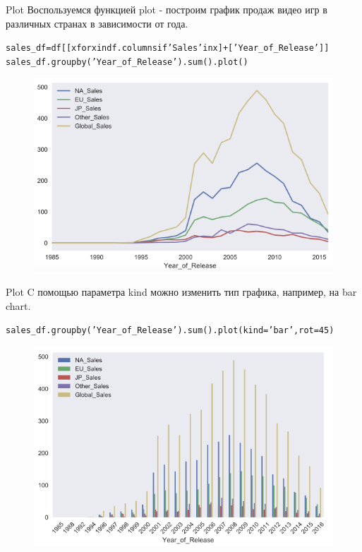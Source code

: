 \documentclass{beamer}
\begin{document}
\begin{frame}[fragile]{Plot}
Воспользуемся функцией plot - построим график продаж видео игр в различных странах в зависимости от года. 
\begin{alltt}
sales_df = df[[x for x in df.columns if 'Sales' in x] + ['Year_of_Release']]
sales_df.groupby('Year_of_Release').sum().plot()
\end{alltt}
\begin{figure}[h]
\centering
\includegraphics[scale=0.4]{images/seaborn-02.png}
\end{figure}
\end{frame}

\begin{frame}[fragile]{Plot}
C помощью параметра kind можно изменить тип графика, например, на bar chart. 
\begin{alltt}
sales_df.groupby('Year_of_Release').sum().plot(kind='bar', rot=45)
\end{alltt}
\begin{figure}[h]
\centering
\includegraphics[scale=0.4]{images/seaborn-03.png}
\end{figure}
\end{frame}
\end{document}
